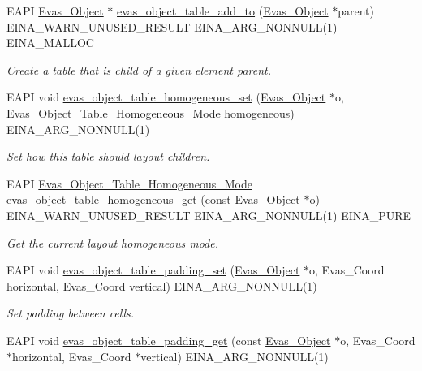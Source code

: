 \begin{DoxyCompactItemize}
EAPI \hyperlink{group__Evas__Object__Group_ga9e19e6dd1f517a0ba437c0114d3e7c97}{Evas\_\-Object} $\ast$ \hyperlink{group__Evas__Object__Table_gab5789072764ac24f48368182bd35d297}{evas\_\-object\_\-table\_\-add\_\-to} (\hyperlink{group__Evas__Object__Group_ga9e19e6dd1f517a0ba437c0114d3e7c97}{Evas\_\-Object} $\ast$parent) EINA\_\-WARN\_\-UNUSED\_\-RESULT EINA\_\-ARG\_\-NONNULL(1) EINA\_\-MALLOC
\begin{DoxyCompactList}\small\item\em Create a table that is child of a given element {\itshape parent\/}. \item\end{DoxyCompactList}\item 
EAPI void \hyperlink{group__Evas__Object__Table_ga85462a0cbafd4ee4ceface6f3f69b413}{evas\_\-object\_\-table\_\-homogeneous\_\-set} (\hyperlink{group__Evas__Object__Group_ga9e19e6dd1f517a0ba437c0114d3e7c97}{Evas\_\-Object} $\ast$o, \hyperlink{group__Evas__Object__Table_ga04f33e792aea51d583c3e572a35ceebe}{Evas\_\-Object\_\-Table\_\-Homogeneous\_\-Mode} homogeneous) EINA\_\-ARG\_\-NONNULL(1)
\begin{DoxyCompactList}\small\item\em Set how this table should layout children. \item\end{DoxyCompactList}\item 
EAPI \hyperlink{group__Evas__Object__Table_ga04f33e792aea51d583c3e572a35ceebe}{Evas\_\-Object\_\-Table\_\-Homogeneous\_\-Mode} \hyperlink{group__Evas__Object__Table_ga1b96719d71cb4ca89a31eb59635df387}{evas\_\-object\_\-table\_\-homogeneous\_\-get} (const \hyperlink{group__Evas__Object__Group_ga9e19e6dd1f517a0ba437c0114d3e7c97}{Evas\_\-Object} $\ast$o) EINA\_\-WARN\_\-UNUSED\_\-RESULT EINA\_\-ARG\_\-NONNULL(1) EINA\_\-PURE
\begin{DoxyCompactList}\small\item\em Get the current layout homogeneous mode. \item\end{DoxyCompactList}\item 
EAPI void \hyperlink{group__Evas__Object__Table_ga6ea229f05036a9c5d30010ad40a30c66}{evas\_\-object\_\-table\_\-padding\_\-set} (\hyperlink{group__Evas__Object__Group_ga9e19e6dd1f517a0ba437c0114d3e7c97}{Evas\_\-Object} $\ast$o, Evas\_\-Coord horizontal, Evas\_\-Coord vertical) EINA\_\-ARG\_\-NONNULL(1)\label{group__Evas__Object__Table_ga6ea229f05036a9c5d30010ad40a30c66}

\begin{DoxyCompactList}\small\item\em Set padding between cells. \item\end{DoxyCompactList}\item 
EAPI void \hyperlink{group__Evas__Object__Table_gabe1af40fbd5e03068bc577e71939934a}{evas\_\-object\_\-table\_\-padding\_\-get} (const \hyperlink{group__Evas__Object__Group_ga9e19e6dd1f517a0ba437c0114d3e7c97}{Evas\_\-Object} $\ast$o, Evas\_\-Coord $\ast$horizontal, Evas\_\-Coord $\ast$vertical) EINA\_\-ARG\_\-NONNULL(1)\label{group__Evas__Object__Table_gabe1af40fbd5e03068bc577e71939934a}


\end{DoxyCompactItemize}
